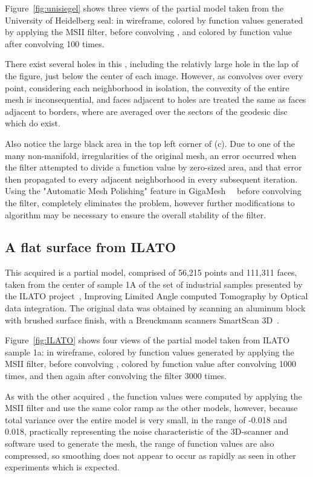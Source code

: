 Figure~\ref{fig:unisiegel} shows three views of the partial model taken from the University of Heidelberg seal: in wireframe, colored by function values generated by applying the MSII filter, before convolving , and colored by function value after convolving  100 times.



There exist several holes in this \tdd{}, including the relativly large hole in the lap of the figure, just below the center of each image. However, as  convolves over every point, considering each neighborhood in isolation, the convexity of the entire mesh is inconsequential, and faces adjacent to holes are treated the same as faces adjacent to borders, where  are averaged over the sectors of the geodesic disc which do exist.

Also notice the large black area in the top left corner of (c). Due to one of the many non-manifold, irregularities of the original mesh, an error occurred when the filter attempted to divide a function value by zero-sized area, and that error then propagated to every adjacent neighborhood in every subsequent iteration. Using the "Automatic Mesh Polishing" feature in GigaMesh~\cite[p.~29-32]{Mara12}~\cite[p.7]{Giga17} before convolving the filter, completely eliminates the problem, however further modifications to  algorithm may be necessary to ensure the overall stability of the filter.

%
%
%
%
\subsection{A flat surface from ILATO}
This acquired \tdd{} is a partial model, comprised of 56,215 points and 111,311 faces, taken from the center of sample 1A of the set of industrial samples presented by the ILATO project~, Improving Limited Angle computed Tomography by Optical data integration\cite{ILATO14}. The original data was obtained by scanning an aluminum block with brushed surface finish, with a Breuckmann scanners SmartScan 3D~\cite{Bayer16}.

Figure~\ref{fig:ILATO} shows four views of the partial model taken from ILATO sample 1a: in wireframe, colored by function values generated by applying the MSII filter, before convolving , colored by function value after convolving  1000 times, and then again after convolving the filter 3000 times.


As with the other acquired \tdd{}, the function values were computed by applying the MSII filter and use the same color ramp as the other models, however, because total variance over the entire model is very small, in the range of -0.018 and 0.018, practically representing the noise characteristic of the 3D-scanner and software used to generate the mesh, the range of function values are also compressed, so smoothing does not appear to occur as rapidly as seen in other experiments which is expected.

